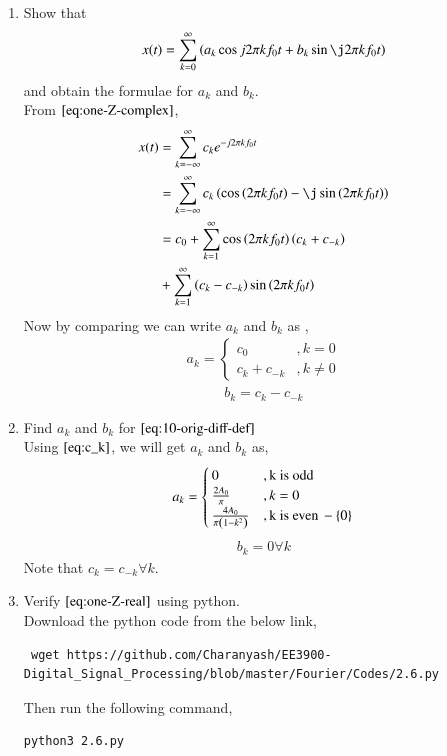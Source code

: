 \documentclass[journal,12pt,twocolumn]{IEEEtran}
\renewcommand\thesection{\arabic{section}}
\begin{document}
\begin{enumerate}[label=\thesection.\arabic*,ref=\thesection.\theenumi]
\item Show that 
\begin{align}
	x(t) = \sum_{k = 0}^{\infty}\brak{a_k\cos{j2\pi kf_0 t}+b_k\sin{\j2\pi kf_0 t}}
\label{eq:one-Z-real}
\end{align}
and obtain the formulae for $a_k$ and $b_k$.\\
\solution From $\eqref{eq:one-Z-complex}$,
 \begin{align}
	 x(t) &= \sum_{k = -\infty}^{\infty}c_ke^{-j 2\pi kf_0t} \\
	      &= \sum_{k= -\infty}^{\infty}c_k\brak{\cos\brak{2 \pi kf_0t} - \j \sin\brak{2 \pi kf_0t}} \\
	      &= c_0 + \sum_{k = 1}^{\infty}\cos\brak{2 \pi kf_0t}\brak{c_k + c_{-k}} \nonumber \\
	       & + \sum_{k=1}^{\infty}\brak{c_k - c_{-k}}\sin\brak{2 \pi kf_0t}
 \end{align}
  Now by comparing we can write $a_k$ and $b_k$ as ,
   \begin{align}
      a_k = \begin{cases}
	       c_0 &, k = 0\\
	       c_k + c_{-k} &, k \neq 0 
	    \end{cases}
   \end{align}
   \begin{align}
	b_k = c_k - c_{-k}
   \end{align}
\item Find $a_k$ and $b_k$ for 
	$\eqref{eq:10-orig-diff-def}$\\
 \solution Using $\eqref{eq:c_k}$, we will get $a_k$ and $b_k$ as,
    \begin{align}
       a_k = \begin{cases}
	       0 &, \text{k is odd}\\
	       \frac{2A_0}{\pi} &, k = 0 \\
	       \frac{4A_0}{\pi\left(1 - k^{2}\right)} &, \text{k is even} \,-\left\{0\right\}
	     \end{cases}
     \end{align}
    \begin{align}
	    b_k = 0 \forall k
    \end{align}
    Note that $c_k = c_{-k} \forall k$.
\item Verify 
$\eqref{eq:one-Z-real}$
using python.\\
\solution Download the python code from the below link,
\begin{lstlisting}
 wget https://github.com/Charanyash/EE3900-Digital_Signal_Processing/blob/master/Fourier/Codes/2.6.py
\end{lstlisting}
Then run the following command,
 \begin{lstlisting}
python3 2.6.py
 \end{lstlisting}


\end{enumerate}
\end{document}
